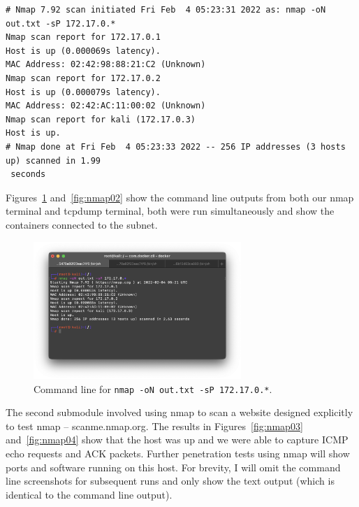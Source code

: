 \documentclass[12pt]{article}
\renewcommand{\footnotesize}{\fontsize{8pt}{10pt}\selectfont}
\begin{document}
\begin{tcolorbox}[colback=CrispBlue!5!white,colframe=CrispBlue!75!black,title=Output of \texttt{nmap -oN out.txt -sP 172.17.0.*}]\footnotesize
\begin{verbatim}
# Nmap 7.92 scan initiated Fri Feb  4 05:23:31 2022 as: nmap -oN out.txt -sP 172.17.0.*
Nmap scan report for 172.17.0.1
Host is up (0.000069s latency).
MAC Address: 02:42:98:88:21:C2 (Unknown)
Nmap scan report for 172.17.0.2
Host is up (0.000079s latency).
MAC Address: 02:42:AC:11:00:02 (Unknown)
Nmap scan report for kali (172.17.0.3)
Host is up.
# Nmap done at Fri Feb  4 05:23:33 2022 -- 256 IP addresses (3 hosts up) scanned in 1.99
 seconds
\end{verbatim}
\end{tcolorbox}

Figures~\ref{fig:nmap01} and~\ref{fig:nmap02} show the command line outputs from both our nmap terminal and tcpdump terminal, both were run simultaneously and show the containers connected to the subnet.

\begin{figure}[!ht]
    \centering
    \includegraphics[width=0.7\textwidth]{figure05.png}\vspace{-1em}
    \caption{Command line for \texttt{nmap -oN out.txt -sP 172.17.0.*}.}
    \label{fig:nmap01}
\end{figure}

The second submodule involved using nmap to scan a website designed explicitly to test nmap -- scanme.nmap.org. The results in Figures~\ref{fig:nmap03} and~\ref{fig:nmap04} show that the host was up and we were able to capture ICMP echo requests and ACK packets. Further penetration tests using nmap will show ports and software running on this host. For brevity, I will omit the command line screenshots for subsequent runs and only show the text output (which is identical to the command line output).
\end{document}
